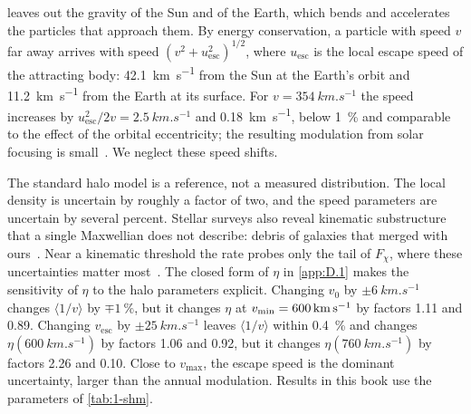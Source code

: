 leaves out the gravity of the Sun and of the Earth, which bends and accelerates the particles that approach them. By energy conservation, a particle with speed $v$ far away arrives with speed $(v^2 + u_{\mathrm{esc}}^2)^{1/2}$, where $u_{\mathrm{esc}}$ is the local escape speed of the attracting body: \SI{42.1}{km.s^{-1}} from the Sun at the Earth's orbit and \SI{11.2}{km.s^{-1}} from the Earth at its surface. For $v = \SI{354}{km.s^{-1}}$ the speed increases by $u_{\mathrm{esc}}^2/2v = \SI{2.5}{km.s^{-1}}$ and \SI{0.18}{km.s^{-1}}, below \SI{1}{\percent} and comparable to the effect of the orbital eccentricity; the resulting modulation from solar focusing is small~\cite[Sect.~5]{green2012astrophysical}. We neglect these speed shifts.

The standard halo model is a reference, not a measured distribution. The local density is uncertain by roughly a factor of two, and the speed parameters are uncertain by several percent. Stellar surveys also reveal kinematic substructure that a single Maxwellian does not describe: debris of galaxies that merged with ours~\cite[Sect.~3.1]{baxter2021recommended}. Near a kinematic threshold the rate probes only the tail of $F_\chi$, where these uncertainties matter most~\cite[Sect.~6]{green2012astrophysical}. The closed form of $\eta$ in \cref{app:D.1} makes the sensitivity of $\eta$ to the halo parameters explicit. Changing $v_0$ by $\pm\SI{6}{km.s^{-1}}$ changes $\langle 1/v\rangle$ by $\mp \SI{1}{\percent}$, but it changes $\eta$ at $v_{\mathrm{min}} = \SI{600}{km.s^{-1}}$ by factors 1.11 and 0.89. Changing $v_{\mathrm{esc}}$ by $\pm\SI{25}{km.s^{-1}}$ leaves $\langle 1/v\rangle$ within \SI{0.4}{\percent} and changes $\eta(\SI{600}{km.s^{-1}})$ by factors 1.06 and 0.92, but it changes $\eta(\SI{760}{km.s^{-1}})$ by factors 2.26 and 0.10. Close to $v_{\mathrm{max}}$, the escape speed is the dominant uncertainty, larger than the annual modulation. Results in this book use the parameters of \cref{tab:1-shm}.
